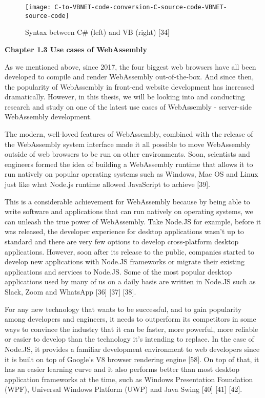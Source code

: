\bigskip
\begin{figure}[hp]
\centering
\texttt{[image: C-to-VBNET-code-conversion-C-source-code-VBNET-source-code]}
\caption{\footnotesize{Syntax between C\# (left) and VB (right) [34]}}
\captionsetup{aboveskip=0pt,font=it}
\end{figure}
\bigskip

\newpage
\textbf{{\Large Chapter 1.3 Use cases of WebAssembly}}

As we mentioned above, since 2017, the four biggest web browsers have all been developed to compile and render WebAssembly out-of-the-box. And since then, the popularity of WebAssembly in front-end website development has increased dramatically. However, in this thesis, we will be looking into and conducting research and study on one of the latest use cases of WebAssembly - server-side WebAssembly development.

The modern, well-loved features of WebAssembly, combined with the release of the WebAssembly system interface made it all possible to move WebAssembly outside of web browsers to be run on other environments. Soon, scientists and engineers formed the idea of building a WebAssembly runtime that allows it to run natively on popular operating systems such as Windows, Mac OS and Linux just like what Node.js runtime allowed JavaScript to achieve [39].

This is a considerable achievement for WebAssembly because by being able to write software and applications that can run natively on operating systems, we can unleash the true power of WebAssembly. Take Node.JS for example, before it was released, the developer experience for desktop applications wasn't up to standard and there are very few options to develop cross-platform desktop applications. However, soon after its release to the public, companies started to develop new applications with Node.JS frameworks or migrate their existing applications and services to Node.JS. Some of the most popular desktop applications used by many of us on a daily basis are written in Node.JS such as Slack, Zoom and WhatsApp [36] [37] [38].

For any new technology that wants to be successful, and to gain popularity among developers and engineers, it needs to outperform its competitors in some ways to convince the industry that it can be faster, more powerful, more reliable or easier to develop than the technology it's intending to replace. In the case of Node.JS, it provides a familiar development environment to web developers since it is built on top of Google's V8 browser rendering engine [58]. On top of that, it has an easier learning curve and it also performs better than most desktop application frameworks at the time, such as Windows Presentation Foundation (WPF), Universal Windows Platform (UWP) and Java Swing [40] [41] [42].

